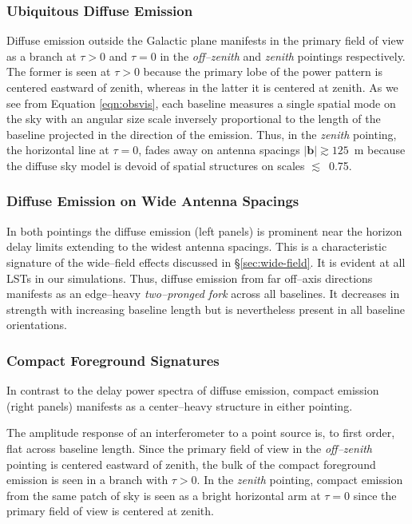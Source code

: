\documentclass[preprint2,iop,numberedappendix,twocolappendix,appendixfloats]{emulateapj}
\begin{document}
\subsubsection{Ubiquitous Diffuse Emission}\label{sec:diffuse-features}

Diffuse emission outside the Galactic plane manifests in the primary field of view as a branch at $\tau>0$ and $\tau=0$ in the {\it off--zenith} and {\it zenith} pointings respectively. The former is seen at $\tau>0$ because the primary lobe of the power pattern is centered eastward of zenith, whereas in the latter it is centered at zenith. As we see from Equation \ref{eqn:obsvis}, each baseline measures a single spatial mode on the sky with an angular size scale inversely proportional to the length of the baseline projected in the direction of the emission. Thus, in the {\it zenith} pointing, the horizontal line at $\tau=0$, fades away on antenna spacings $|\boldsymbol{b}| \gtrsim 125$~m because the diffuse sky model is devoid of spatial structures on scales $\lesssim$~0.75\arcdeg. 

\subsubsection{Diffuse Emission on Wide Antenna Spacings}\label{sec:diffuse-long-baselines}

In both pointings the diffuse emission (left panels) is prominent near the horizon delay limits extending to the widest antenna spacings. This is a characteristic signature of the wide--field effects discussed in \S\ref{sec:wide-field}. It is evident at all LSTs in our simulations. Thus, diffuse emission from far off--axis directions manifests as an edge--heavy {\it two--pronged fork} across all baselines. It decreases in strength with increasing baseline length but is nevertheless present in all baseline orientations.   

\subsubsection{Compact Foreground Signatures}\label{sec:compact}

In contrast to the delay power spectra of diffuse emission, compact emission (right panels) manifests as a center--heavy structure in either pointing. 

The amplitude response of an interferometer to a point source is, to first order, flat across baseline length. Since the primary field of view in the {\it off--zenith} pointing is centered eastward of zenith, the bulk of the compact foreground emission is seen in a branch with $\tau>0$. In the {\it zenith} pointing, compact emission from the same patch of sky is seen as a bright horizontal arm at $\tau=0$ since the primary field of view is centered at zenith. 
\end{document}
